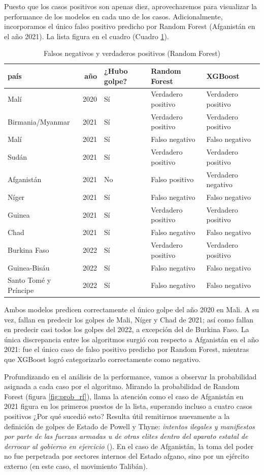 \documentclass{article}
\begin{document}
Puesto que los casos positivos son apenas diez, aprovecharemos para visualizar la performance
de los modelos en cada uno de los casos. Adicionalmente, incorporamos el único falso positivo
predicho por Random Forest (Afganistán en el año 2021). La lista figura en el cuadro 
(Cuadro \ref{tab:resultados}).

\begin{table}[H]
 \centering
  \begin{tabular}{lrlll}
   \toprule
   país & año & ¿Hubo golpe? & Random Forest & XGBoost \\
   \midrule
   Malí & 2020 & Sí & Verdadero positivo & Verdadero positivo \\
   Birmania/Myanmar & 2021 & Sí & Verdadero positivo & Verdadero positivo \\
   Malí & 2021 & Sí & Falso negativo & Falso negativo \\
   Sudán & 2021 & Sí & Verdadero positivo & Verdadero positivo \\
   Afganistán & 2021 & No & Falso positivo & Verdadero negativo \\
   Níger & 2021 & Sí & Falso negativo & Falso negativo \\
   Guinea & 2021 & Sí & Verdadero positivo & Verdadero positivo \\
   Chad & 2021 & Sí & Falso negativo & Falso negativo \\
   Burkina Faso & 2022 & Sí & Verdadero positivo & Verdadero positivo \\
   Guinea-Bisáu & 2022 & Sí & Falso negativo & Falso negativo \\
   Santo Tomé y Príncipe & 2022 & Sí & Falso negativo & Falso negativo \\
   \bottomrule
  \end{tabular}
 \caption{Falsos negativos y verdaderos positivos (Random Forest) \label{tab:resultados}}
\end{table}

Ambos modelos predicen correctamente el único golpe del año 2020 en Mali. A su
vez, fallan en predecir los golpes de Mali, Níger y Chad de 2021; así como fallan en predecir
casi todos los golpes del 2022, a excepción del de Burkina Faso. La única discrepancia entre
los algoritmos surgió con respecto a Afganistán en el año 2021: fue el único caso de falso
positivo predicho por Random Forest, mientras que XGBoost logró categorizarlo correctamente
como negativo.

Profundizando en el análisis de la performance, vamos a observar la probabilidad asignada
a cada caso por el algoritmo. Mirando la probabilidad de Random Forest 
(figura \ref{fig:prob_rf}), llama la atención como el caso de Afganistán en 2021 figura
en los primeros puestos de la lista, superando incluso a cuatro casos positivos ¿Por qué sucedió esto?
Resulta útil remitirnos nuevamente a la definición de golpes de Estado de Powell y Thyne:
\textit{intentos ilegales y manifiestos por parte de las fuerzas armadas u de otras elites dentro
del aparato estatal de derrocar al gobierno en ejercicio} (\cite[p.~252]{Pow11}). En el caso de 
Afganistán, la toma del poder no fue perpetrada por sectores internos del Estado afgano, sino
por un ejército externo (en este caso, el movimiento Talibán).
\end{document}
